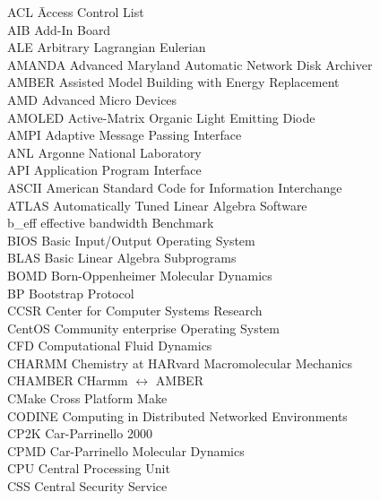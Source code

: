 %



\begin{tabbing}
ACL     \hspace{0.60in} \= Access Control List\\
AIB     \> Add-In Board\\
ALE     \> Arbitrary Lagrangian Eulerian\\
AMANDA  \> Advanced Maryland Automatic Network Disk Archiver\\
AMBER   \> Assisted Model Building with Energy Replacement\\
AMD     \> Advanced Micro Devices\\
AMOLED  \> Active-Matrix Organic Light Emitting Diode\\
AMPI    \> Adaptive Message Passing Interface\\
ANL     \> Argonne National Laboratory\\
API     \> Application Program Interface\\
ASCII   \> American Standard Code for Information Interchange\\
ATLAS   \> Automatically Tuned Linear Algebra Software\\
b\_eff  \> effective bandwidth Benchmark\\
BIOS    \> Basic Input/Output Operating System\\
BLAS    \> Basic Linear Algebra Subprograms\\
BOMD    \> Born-Oppenheimer Molecular Dynamics\\
BP      \> Bootstrap Protocol\\
CCSR    \> Center for Computer Systems Research\\
CentOS  \> Community enterprise Operating System\\
CFD     \> Computational Fluid Dynamics\\
CHARMM  \> Chemistry at HARvard Macromolecular Mechanics\\
CHAMBER \> CHarmm $\leftrightarrow$ AMBER\\
CMake   \> Cross Platform Make\\
CODINE  \> Computing in Distributed Networked Environments\\
CP2K    \> Car-Parrinello 2000\\
CPMD    \> Car-Parrinello Molecular Dynamics\\
CPU     \> Central Processing Unit\\
CSS     \> Central Security Service\\

\end{tabbing}
